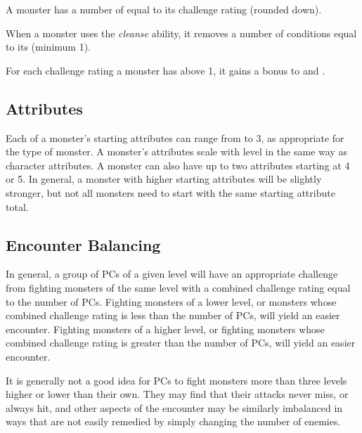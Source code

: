          A monster has a number of  equal to its challenge rating  (rounded down).

         When a monster uses the \textit{cleanse} ability, it removes a number of conditions equal to its  (minimum 1).

         For each challenge rating a monster has above 1, it gains a  bonus to  and .

    \subsection{Attributes}
        Each of a monster's starting attributes can range from  to 3, as appropriate for the type of monster.
        A monster's attributes scale with level in the same way as character attributes.
        A monster can also have up to two attributes starting at 4 or 5.
        In general, a monster with higher starting attributes will be slightly stronger, but not all monsters need to start with the same starting attribute total.

    \subsection{Encounter Balancing}\label{Encounter Balancing}
        In general, a group of PCs of a given level will have an appropriate challenge from fighting monsters of the same level with a combined challenge rating equal to the number of PCs.
        Fighting monsters of a lower level, or monsters whose combined challenge rating is less than the number of PCs, will yield an easier encounter.
        Fighting monsters of a higher level, or fighting monsters whose combined challenge rating is greater than the number of PCs, will yield an easier encounter.

        It is generally not a good idea for PCs to fight monsters more than three levels higher or lower than their own.
        They may find that their attacks never miss, or always hit, and other aspects of the encounter may be similarly imbalanced in ways that are not easily remedied by simply changing the number of enemies.


